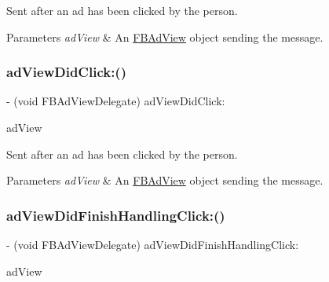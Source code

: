 Sent after an ad has been clicked by the person.


\begin{DoxyParams}{Parameters}
{\em ad\+View} & An \hyperlink{interfaceFBAdView}{F\+B\+Ad\+View} object sending the message. \\
\hline
\end{DoxyParams}
\mbox{\label{protocolFBAdViewDelegate_01-p_a7842ffc41d5df660da7238e182ff634a}} 
\subsubsection{\texorpdfstring{ad\+View\+Did\+Click\+:()}{adViewDidClick:()}\hspace{0.1cm}{\footnotesize\ttfamily [5/5]}}
{\footnotesize\ttfamily -\/ (void F\+B\+Ad\+View\+Delegate) ad\+View\+Did\+Click\+: \begin{DoxyParamCaption}\item[{(\hyperlink{interfaceFBAdView}{F\+B\+Ad\+View} $\ast$)}]{ad\+View }\end{DoxyParamCaption}\hspace{0.3cm}{\ttfamily [optional]}}

Sent after an ad has been clicked by the person.


\begin{DoxyParams}{Parameters}
{\em ad\+View} & An \hyperlink{interfaceFBAdView}{F\+B\+Ad\+View} object sending the message. \\
\hline
\end{DoxyParams}
\mbox{\label{protocolFBAdViewDelegate_01-p_a7fb041c26e7163226dfc7f2565c543b6}} 
\subsubsection{\texorpdfstring{ad\+View\+Did\+Finish\+Handling\+Click\+:()}{adViewDidFinishHandlingClick:()}\hspace{0.1cm}{\footnotesize\ttfamily [1/5]}}
{\footnotesize\ttfamily -\/ (void F\+B\+Ad\+View\+Delegate) ad\+View\+Did\+Finish\+Handling\+Click\+: \begin{DoxyParamCaption}\item[{(\hyperlink{interfaceFBAdView}{F\+B\+Ad\+View} $\ast$)}]{ad\+View }\end{DoxyParamCaption}\hspace{0.3cm}{\ttfamily [optional]}}

